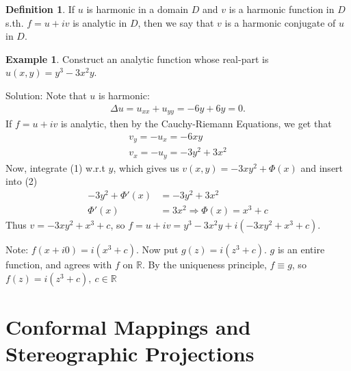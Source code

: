 \documentclass[12pt, a4paper]{article}
\theoremstyle{plain}
\theoremstyle{definition}
\newtheorem{definition}{Definition} %
\newtheorem{example}{Example} %
\begin{document}
			\begin{definition}
				If $u$ is harmonic in a domain $D$ and $v$ is a harmonic function in $D$ s.th. $f=u+iv$ is analytic in $D$, then we say that $v$ is a harmonic conjugate of $u$ in $D$.\\
			\end{definition}

			\begin{example}
				Construct an analytic function whose real-part is $u(x,y) = y^3-3x^2y$.

				Solution: Note that $u$ is harmonic:
				\begin{align*}
					\Delta u = u_{xx} + u_{yy} = -6y + 6y = 0.
				\end{align*}
				If $f=u+iv$ is analytic, then by the Cauchy-Riemann Equations, we get that
				\begin{align*}
					v_y = -u_x = -6xy\tag*{(1)}\\
					v_x = -u_y = -3y^2+3x^2\tag*{(2)}
				\end{align*}
				Now, integrate (1) w.r.t $y$, which gives us $v(x,y) = -3xy^2+\Phi(x)$ and insert into (2)
				\begin{align*}
					-3y^2+\Phi'(x) &= -3y^2+3x^2\\
					\Phi'(x) &= 3x^2 \Rightarrow \Phi(x) = x^3+c
				\end{align*}
				Thus $v = -3xy^2 + x^3 + c$, so $f = u+iv = y^3-3x^2y + i(-3xy^2+x^3+c)$.

				Note: $f(x+i0) = i(x^3+c)$. Now put $g(z) = i(z^3+c)$. $g$ is an entire function, and agrees with $f$ on $\mathbb{R}$. By the uniqueness principle, $f\equiv g$, so $f(z) = i(z^3+c),\:c\in \mathbb{R}$
			\end{example}
	\section{Conformal Mappings and Stereographic Projections} %
	\label{sec:conformal_mappings_and_stereographic_projections}
\end{document}
